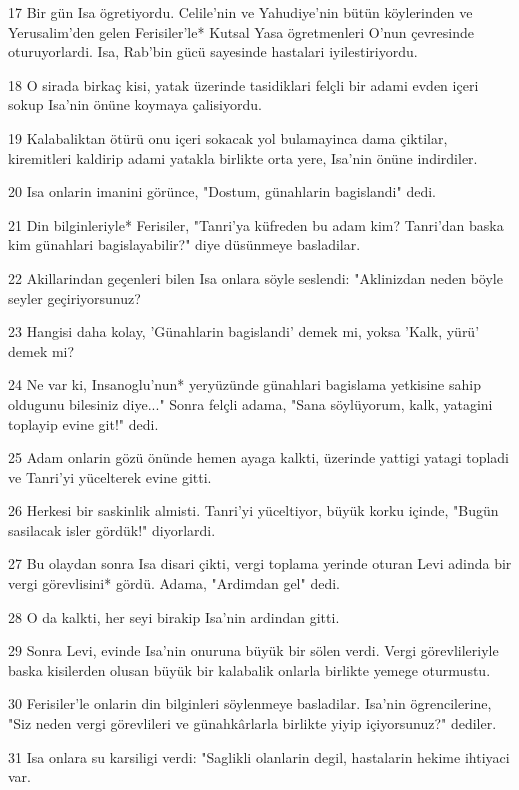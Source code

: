 \par 17 Bir gün Isa ögretiyordu. Celile'nin ve Yahudiye'nin bütün köylerinden ve Yerusalim'den gelen Ferisiler'le* Kutsal Yasa ögretmenleri O'nun çevresinde oturuyorlardi. Isa, Rab'bin gücü sayesinde hastalari iyilestiriyordu.
\par 18 O sirada birkaç kisi, yatak üzerinde tasidiklari felçli bir adami evden içeri sokup Isa'nin önüne koymaya çalisiyordu.
\par 19 Kalabaliktan ötürü onu içeri sokacak yol bulamayinca dama çiktilar, kiremitleri kaldirip adami yatakla birlikte orta yere, Isa'nin önüne indirdiler.
\par 20 Isa onlarin imanini görünce, "Dostum, günahlarin bagislandi" dedi.
\par 21 Din bilginleriyle* Ferisiler, "Tanri'ya küfreden bu adam kim? Tanri'dan baska kim günahlari bagislayabilir?" diye düsünmeye basladilar.
\par 22 Akillarindan geçenleri bilen Isa onlara söyle seslendi: "Aklinizdan neden böyle seyler geçiriyorsunuz?
\par 23 Hangisi daha kolay, 'Günahlarin bagislandi' demek mi, yoksa 'Kalk, yürü' demek mi?
\par 24 Ne var ki, Insanoglu'nun* yeryüzünde günahlari bagislama yetkisine sahip oldugunu bilesiniz diye..." Sonra felçli adama, "Sana söylüyorum, kalk, yatagini toplayip evine git!" dedi.
\par 25 Adam onlarin gözü önünde hemen ayaga kalkti, üzerinde yattigi yatagi topladi ve Tanri'yi yücelterek evine gitti.
\par 26 Herkesi bir saskinlik almisti. Tanri'yi yüceltiyor, büyük korku içinde, "Bugün sasilacak isler gördük!" diyorlardi.
\par 27 Bu olaydan sonra Isa disari çikti, vergi toplama yerinde oturan Levi adinda bir vergi görevlisini* gördü. Adama, "Ardimdan gel" dedi.
\par 28 O da kalkti, her seyi birakip Isa'nin ardindan gitti.
\par 29 Sonra Levi, evinde Isa'nin onuruna büyük bir sölen verdi. Vergi görevlileriyle baska kisilerden olusan büyük bir kalabalik onlarla birlikte yemege oturmustu.
\par 30 Ferisiler'le onlarin din bilginleri söylenmeye basladilar. Isa'nin ögrencilerine, "Siz neden vergi görevlileri ve günahkârlarla birlikte yiyip içiyorsunuz?" dediler.
\par 31 Isa onlara su karsiligi verdi: "Saglikli olanlarin degil, hastalarin hekime ihtiyaci var.
